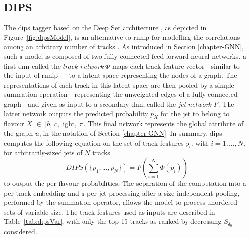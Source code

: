 \subsection{DIPS}
The \gls{dips} tagger based on the Deep Set architecture \cite{NIPS2017f22e4747}, as depicted in Figure~\ref{fig:dipsModel}, is an alternative to \gls{rnnip} for modelling the correlations among an arbitrary number of tracks \cite{ATL-PHYS-PUB-2020-014}. As introduced in Section \ref{chapter-GNN}, such a model is composed of two fully-connected feed-forward neural networks. a first \gls{dnn} called the \textit{track network} $\Phi$ maps each track feature vector—similar to the input of \gls{rnnip} — to a latent space representing the nodes of a graph. The representations of each track in this latent space are then pooled by a simple summation operation - representing the unweighted edges of a fully-connected graph - and given as input to a secondary \gls{dnn}, called the \textit{jet network} $F$. The latter network outputs the predicted probability $p_X$ for the jet to belong to flavour $X$ $\in$ [$b$, $c$, light, $\tau$]. This final network represents the global attribute of the graph $u$, in the notation of Section \ref{chapter-GNN}. In summary, \gls{dips} computes the following equation on the set of track features ${ p_i }$, with $i = 1, ..., N$, for arbitrarily-sized jets of $N$ tracks
\begin{equation}
  DIPS( \{p_1, ..., p_N \} ) = F\left( \sum_{i=1}^N \Phi(p_i) \right)
\end{equation}
to output the per-flavour probabilities. The separation of the computation into a per-track embedding and a per-jet processing after a size-independent pooling, performed by the summation operator, allows the model to process unordered sets of variable size. The track features used as inputs are described in Table~\ref{tab:dipsVar}, with only the top 15 tracks as ranked by decreasing $S_{d_0}$ considered. \\


